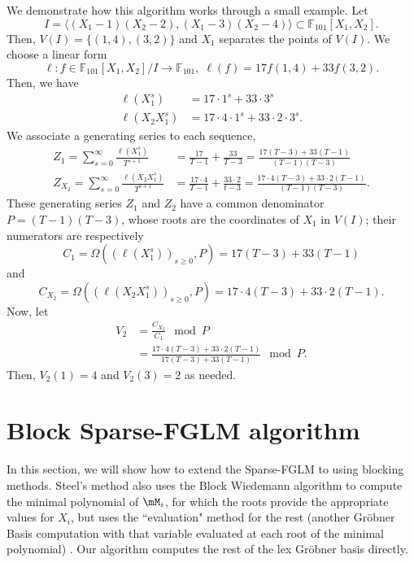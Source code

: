\documentclass[12pt]{article}
\newcommand{\minpoly}{P}
\def\F {\ensuremath{\mathbb{F}}}
\begin{document}
We demonstrate how this algorithm works through a small example. Let 
$$I = \langle (X_1-1)(X_2-2),(X_1-3)(X_2-4)\rangle \subset
\F_{101}[X_1,X_2].$$ Then, $V(I) = \{ (1,4),(3,2) \}$ and $X_1$ separates the
points of $V(I)$. We choose a  linear form 
$$\ell: f \in \F_{101}[X_1,X_2]/I \to \F_{101},\;\ell(f) = 17 f(1,4) + 33 f(3,2).$$
Then, we have
\begin{align*}
\ell(X_1^s) &= 17 \cdot 1^s + 33 \cdot 3^s\\
\ell(X_2X_1^s) &= 17 \cdot 4 \cdot 1^s + 33 \cdot 2 \cdot 3^s.
\end{align*} 
We associate a generating series to each sequence,
\begin{align*}
Z_1 = \sum_{s = 0}^{\infty} \frac{\ell(X^s_1)}{T^{s+1}}
&= \frac{17}{T-1} + \frac{33}{T-3}
= \frac{17(T-3)+33(T-1)}{(T-1)(T-3)} \\
Z_{X_2} = \sum_{s=0}^{\infty} \frac{\ell(X_2X_1^s)}{T^{s+1} }
&= \frac{17\cdot 4}{T-1} + \frac{33 \cdot 2}{t-3}
= \frac{17\cdot 4 (T-3) + 33\cdot 2(T-1)}{(T-1)(T-3)}.
\end{align*}
These generating series $Z_1$ and $Z_2$ have a common denominator $\minpoly = (T-1)(T-3)$,
whose roots are the coordinates of $X_1$ in $V(I)$;
their numerators are respectively
$$C_{1} = \Omega((\ell(X^s_1))_{s\ge 0},\minpoly) = 17 (T-3) + 33(T-1)$$
and
$$C_{X_2} = \Omega((\ell(X_2X^s_1))_{s\ge 0},\minpoly) = 17\cdot 4 (T-3) + 33\cdot 2(T-1).$$
Now, let
\begin{align*}
V_2 
&=\frac{C_{X_2}}{C_1} \mod \minpoly\\
&=\frac{17\cdot 4 (T-3) + 33\cdot 2(T-1)}{17(T-3)+33(T-1)} \mod \minpoly.
\end{align*}
Then, $ V_2(1) = 4$ and $V_2(3) = 2$ as needed.



\section{Block Sparse-FGLM algorithm}
In this section, we will show how to extend the Sparse-FGLM
to using blocking methods. Steel's method also uses the
Block Wiedemann algorithm to compute the minimal polynomial
of $\mM_i$, for which the roots provide the appropriate
values for $X_i$,
but uses the ``evaluation" method for the rest
(another Gr\"obner Basis computation with that variable
evaluated at each root of the minimal polynomial) \cite{Steel15}.
Our algorithm computes the rest of the lex
Gr\"obner basis directly.
\end{document}
